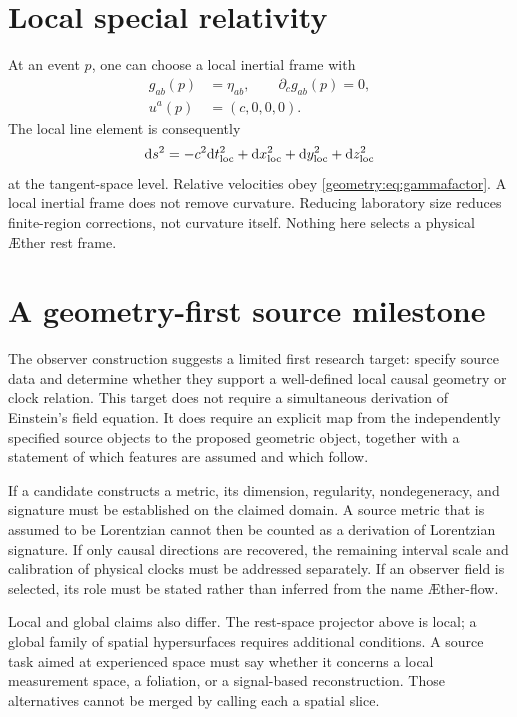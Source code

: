 \documentclass[11pt,oneside]{report}
\newcommand{\Aether}{\AE{}ther}
\newcommand{\Aflow}{\AE{}ther-flow}
\newcommand{\dd}{\mathrm d}
\theoremstyle{remark}
\numberwithin{definition}{chapter}
\numberwithin{proposition}{chapter}
\numberwithin{remark}{chapter}
\begin{document}
\section{Local special relativity}
At an event $p$, one can choose a local inertial frame with
\begin{align}
g_{ab}(p)&=\eta_{ab},\qquad \partial_cg_{ab}(p)=0,\label{geometry:eq:localinertial}\\
u^a(p)&=(c,0,0,0).\label{geometry:eq:localobserver}
\end{align}
The local line element is consequently
\begin{equation}
\dd s^2=-c^2\dd t_{\rm loc}^2+\dd x_{\rm loc}^2+
\dd y_{\rm loc}^2+\dd z_{\rm loc}^2
\label{geometry:eq:localsr}
\end{equation}
at the tangent-space level. Relative velocities obey \eqref{geometry:eq:gammafactor}. A local inertial frame does not remove curvature. Reducing laboratory size reduces finite-region corrections, not curvature itself. Nothing here selects a physical \Aether{} rest frame.

\section{A geometry-first source milestone}
The observer construction suggests a limited first research target: specify source data and determine whether they support a well-defined local causal geometry or clock relation. This target does not require a simultaneous derivation of Einstein's field equation. It does require an explicit map from the independently specified source objects to the proposed geometric object, together with a statement of which features are assumed and which follow.

If a candidate constructs a metric, its dimension, regularity, nondegeneracy, and signature must be established on the claimed domain. A source metric that is assumed to be Lorentzian cannot then be counted as a derivation of Lorentzian signature. If only causal directions are recovered, the remaining interval scale and calibration of physical clocks must be addressed separately. If an observer field is selected, its role must be stated rather than inferred from the name \Aflow{}.

Local and global claims also differ. The rest-space projector above is local; a global family of spatial hypersurfaces requires additional conditions. A source task aimed at experienced space must say whether it concerns a local measurement space, a foliation, or a signal-based reconstruction. Those alternatives cannot be merged by calling each a spatial slice.
\end{document}
